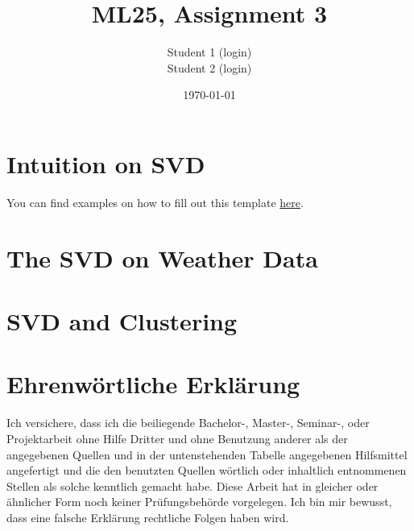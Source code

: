 \documentclass[a4paper,oneside,bibliography=totoc]{scrartcl}
\begin{document}
\title{ML25, Assignment 3}
\author{Student 1 (login)\\
  Student 2 (login)}
\date{\today}
\maketitle

\section{Intuition on SVD}

You can find examples on how to fill out this template
\href{https://www.uni-mannheim.de/media/Einrichtungen/dws/Files_Teaching/Theses/dws-templates.zip}{here}.

\section{The SVD on Weather Data}

\section{SVD and Clustering}

\clearpage
\section*{Ehrenwörtliche Erklärung}

Ich versichere, dass ich die beiliegende Bachelor-, Master-, Seminar-, oder
Projektarbeit ohne Hilfe Dritter und ohne Benutzung anderer als der angegebenen
Quellen und in der untenstehenden Tabelle angegebenen Hilfsmittel angefertigt
und die den benutzten Quellen wörtlich oder inhaltlich entnommenen Stellen als
solche kenntlich gemacht habe. Diese Arbeit hat in gleicher oder ähnlicher Form
noch keiner Prüfungsbehörde vorgelegen. Ich bin mir bewusst, dass eine falsche
Erklärung rechtliche Folgen haben wird.
\end{document}
